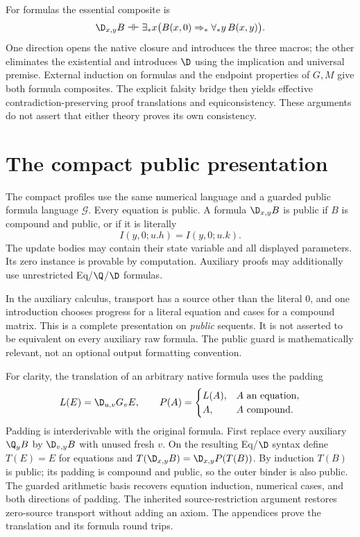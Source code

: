 For formulas the essential composite is
\[
 \D_{x,y}B\dashv\vdash
 \exists_*x\bigl(B(x,0)\Rightarrow_*\forall_*y\,B(x,y)\bigr).
\]
One direction opens the native closure and introduces the three macros;
the other eliminates the existential and introduces $\D$ using the
implication and universal premise. External induction on formulas and
the endpoint properties of $G,M$ give both formula composites. The
explicit falsity bridge then yields effective contradiction-preserving
proof translations and equiconsistency. These arguments do not assert
that either theory proves its own consistency.

\section{The compact public presentation}
\label{sec:public-boundary}

The compact profiles use the same numerical language and a guarded public
formula language $\mathcal G$. Every equation is public. A formula
$\D_{x,y}B$ is public if $B$ is compound and public, or if it is literally
\[
 I(y,0;u.h)=I(y,0;u.k).
\]
The update bodies may contain their state variable and all displayed
parameters. Its zero instance is provable by computation. Auxiliary
proofs may additionally use unrestricted Eq/$\Q$/$\D$ formulas.

In the auxiliary calculus, transport has a source other than the literal
$0$, and one introduction chooses progress for a literal equation and
cases for a compound matrix. This is a complete presentation on
\emph{public} sequents. It is not asserted to be equivalent on every
auxiliary raw formula. The public guard is mathematically relevant, not
an optional output formatting convention.

For clarity, the translation of an arbitrary native formula uses the
padding
\[
 L(E)=\D_{u,v}G_vE,\qquad
 P(A)=\begin{cases}L(A),&A\text{ an equation},\\A,&A\text{ compound}.
 \end{cases}
\]
Padding is interderivable with the original formula. First replace every
auxiliary $\Q_yB$ by $\D_{v,y}B$ with unused fresh $v$. On the resulting
Eq/$\D$ syntax define $T(E)=E$ for equations and
$T(\D_{x,y}B)=\D_{x,y}P(T(B))$. By induction $T(B)$ is public;
its padding is compound and public, so the outer binder is also public.
The guarded arithmetic basis recovers equation induction, numerical
cases, and both directions of padding. The inherited source-restriction
argument restores zero-source transport without adding an axiom. The
appendices prove the translation and its formula round trips.

